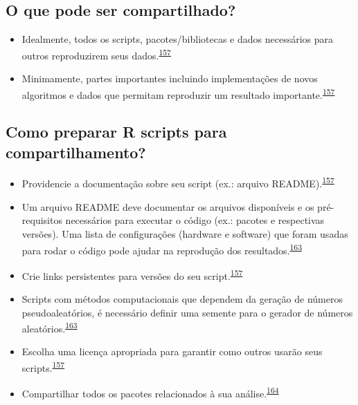 \documentclass[
]{book}
\begin{document}
\hypertarget{o-que-pode-ser-compartilhado}{%
\subsection{O que pode ser compartilhado?}\label{o-que-pode-ser-compartilhado}}

\begin{itemize}
\item
  Idealmente, todos os scripts, pacotes/bibliotecas e dados necessários para outros reproduzirem seus dados.\textsuperscript{\protect\hyperlink{ref-Eglen2017}{157}}
\item
  Minimamente, partes importantes incluindo implementações de novos algoritmos e dados que permitam reproduzir um resultado importante.\textsuperscript{\protect\hyperlink{ref-Eglen2017}{157}}
\end{itemize}

\hypertarget{como-preparar-r-scripts-para-compartilhamento}{%
\subsection{Como preparar R scripts para compartilhamento?}\label{como-preparar-r-scripts-para-compartilhamento}}

\begin{itemize}
\item
  Providencie a documentação sobre seu script (ex.: arquivo README).\textsuperscript{\protect\hyperlink{ref-Eglen2017}{157}}
\item
  Um arquivo README deve documentar os arquivos disponíveis e os pré-requisitos necessários para executar o código (ex.: pacotes e respectivas versões). Uma lista de configurações (hardware e software) que foram usadas para rodar o código pode ajudar na reprodução dos resultados.\textsuperscript{\protect\hyperlink{ref-hofner2015}{163}}
\item
  Crie links persistentes para versões do seu script.\textsuperscript{\protect\hyperlink{ref-Eglen2017}{157}}
\item
  Scripts com métodos computacionais que dependem da geração de números pseudoaleatórios, é necessário definir uma semente para o gerador de números aleatórios.\textsuperscript{\protect\hyperlink{ref-hofner2015}{163}}
\item
  Escolha uma licença apropriada para garantir como outros usarão seus scripts.\textsuperscript{\protect\hyperlink{ref-Eglen2017}{157}}
\item
  Compartilhar todos os pacotes relacionados à sua análise.\textsuperscript{\protect\hyperlink{ref-Zhao2023}{164}}
\end{itemize}
\end{document}
